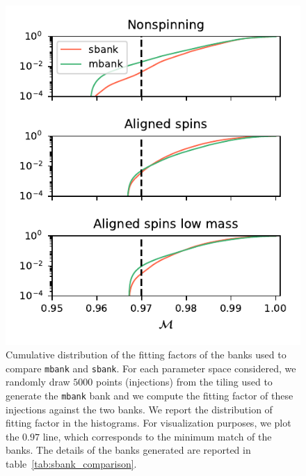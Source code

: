 \documentclass[twocolumn,showpacs,preprintnumbers,nofootinbib,prd,
superscriptaddress,10pt]{revtex4-2}
\begin{document}
\begin{figure}[t!]
	\includegraphics{sbank_comparison}
	\caption{
	Cumulative distribution of the fitting factors of the banks used to compare \texttt{mbank} and \texttt{sbank}. For each parameter space considered, we randomly draw $5000$ points (injections) from the tiling used to generate the \texttt{mbank} bank and we compute the fitting factor of these injections against the two banks. We report the distribution of fitting factor in the histograms. For visualization purposes, we plot the $0.97$ line, which corresponds to the minimum match of the banks.
	The details of the banks generated are reported in table~\ref{tab:sbank_comparison}.
	}
	\label{fig:sbank_comparison}
\end{figure}
\end{document}
